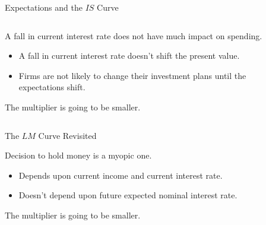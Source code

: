 \documentclass[shownotes,11pt, aspectratio=169]{beamer}
\newenvironment{wideitemize}{\itemize\addtolength{\itemsep}{10pt}}{\enditemize}
\begin{document}
\begin{frame}{Expectations and the $IS$ Curve}
\begin{columns}[T] %
\begin{column}{.52\textwidth}
  \begin{wideitemize}
    \item A fall in current interest rate does not have much impact on spending.
         \begin{itemize}
         \item A fall in current interest rate doesn't shift the present value.
         \item Firms are not likely to change their investment plans until the expectations shift.
         \end{itemize}
    \item The multiplier is going to be smaller. 
     \end{wideitemize}
\end{column}%
\pause
\hfill%
\begin{column}{.44\textwidth}
\end{column}%
\end{columns}
\end{frame}

\begin{frame}{The $LM$ Curve Revisited}
\begin{wideitemize}
    \item Decision to hold money is a myopic one.
         \begin{itemize}
         \item Depends upon current income and current interest rate.
         \item Doesn't depend upon future expected nominal interest rate.
         \end{itemize}
    \item The multiplier is going to be smaller. 
\end{wideitemize}
\end{frame}
\end{document}
